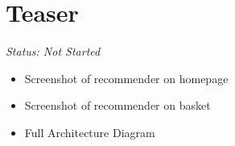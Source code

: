 \chapter{Teaser}

\emph{Status: Not Started}

\begin{itemize}
\item Screenshot of recommender on homepage
\item Screenshot of recommender on basket
\item Full Architecture Diagram
\end{itemize}